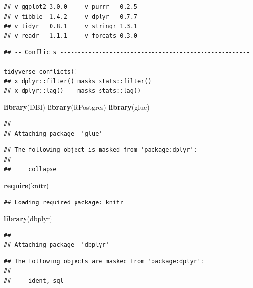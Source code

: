 \documentclass[]{book}
\newenvironment{Shaded}{\begin{snugshade}}{\end{snugshade}}
\newcommand{\KeywordTok}[1]{\textcolor[rgb]{0.13,0.29,0.53}{\textbf{#1}}}
\newcommand{\NormalTok}[1]{#1}
\theoremstyle{definition}
\theoremstyle{definition}
\theoremstyle{definition}
\theoremstyle{remark}
\begin{document}
\begin{verbatim}
## v ggplot2 3.0.0     v purrr   0.2.5
## v tibble  1.4.2     v dplyr   0.7.7
## v tidyr   0.8.1     v stringr 1.3.1
## v readr   1.1.1     v forcats 0.3.0
\end{verbatim}

\begin{verbatim}
## -- Conflicts ---------------------------------------------------------------------------------------------------------------- tidyverse_conflicts() --
## x dplyr::filter() masks stats::filter()
## x dplyr::lag()    masks stats::lag()
\end{verbatim}

\begin{Shaded}
\begin{Highlighting}[]
\KeywordTok{library}\NormalTok{(DBI)}
\KeywordTok{library}\NormalTok{(RPostgres)}
\KeywordTok{library}\NormalTok{(glue)}
\end{Highlighting}
\end{Shaded}

\begin{verbatim}
## 
## Attaching package: 'glue'
\end{verbatim}

\begin{verbatim}
## The following object is masked from 'package:dplyr':
## 
##     collapse
\end{verbatim}

\begin{Shaded}
\begin{Highlighting}[]
\KeywordTok{require}\NormalTok{(knitr)}
\end{Highlighting}
\end{Shaded}

\begin{verbatim}
## Loading required package: knitr
\end{verbatim}

\begin{Shaded}
\begin{Highlighting}[]
\KeywordTok{library}\NormalTok{(dbplyr)}
\end{Highlighting}
\end{Shaded}

\begin{verbatim}
## 
## Attaching package: 'dbplyr'
\end{verbatim}

\begin{verbatim}
## The following objects are masked from 'package:dplyr':
## 
##     ident, sql
\end{verbatim}
\end{document}
